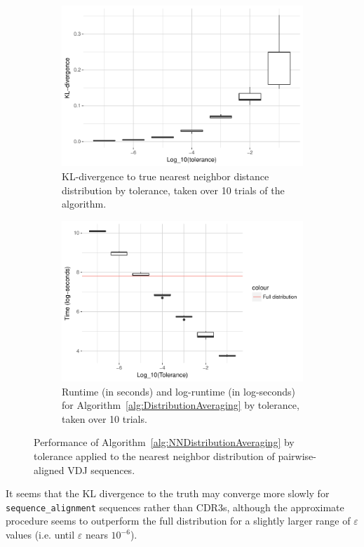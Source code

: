\documentclass{article}
\begin{document}
\begin{figure}
\begin{subfigure}{.49\textwidth}
        \includegraphics[width=\linewidth]{Figures/NearestNeighbor/Sequence/div_by_tol.pdf}
    	\caption{KL-divergence to true nearest neighbor distance distribution by tolerance, taken over 10 trials of the algorithm.}
    	\label{fig:NNDivergencesSequence}
	\end{subfigure}
    \begin{subfigure}{.49\textwidth}
    	\includegraphics[width=0.9\linewidth]{Figures/NearestNeighbor/Sequence/log_time_by_tol.pdf}
    	\caption{Runtime (in seconds) and log-runtime (in log-seconds) for Algorithm~\ref{alg:DistributionAveraging} by tolerance, taken over 10 trials.}
    	\label{fig:NNTimesSequence}
    \end{subfigure}
    \caption{Performance of Algorithm~\ref{alg:NNDistributionAveraging} by tolerance applied to the nearest neighbor distribution of pairwise-aligned VDJ sequences.}
\end{figure}
It seems that the KL divergence to the truth may converge more slowly for \texttt{sequence\_alignment} sequences rather than CDR3s, although the approximate procedure seems to outperform the full distribution for a slightly larger range of $\varepsilon$ values (i.e. until $\varepsilon$ nears $10^{-6}$).
\end{document}
